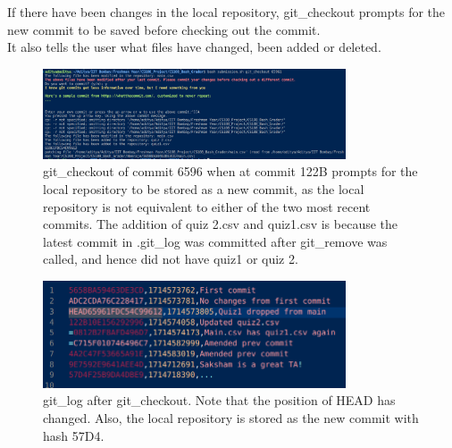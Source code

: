 \documentclass{article}
\begin{document}
    If there have been changes in the local repository, git\_checkout prompts for the new commit to be saved before checking out the commit.\\
    It also tells the user what files have changed, been added or deleted.\\
    \begin{figure}[htbp]
        \centering
        \includegraphics[width=0.8\textwidth]{git_checkout_65961_from_122B.png}
        \caption{git\_checkout of commit 6596 when at commit 122B prompts for the local repository to be stored as a new commit, as the local repository is not equivalent to either of the two most recent commits. The addition of quiz 2.csv and quiz1.csv is because the latest commit in .git\_log was committed after git\_remove was called, and hence did not have quiz1 or quiz 2.}
        \label{fig:git_checkout}
    \end{figure}
    \begin{figure}[htbp]
        \centering
        \includegraphics[width=0.8\textwidth]{git log file after checkout.png}
        \caption{git\_log after git\_checkout. Note that the position of HEAD has changed. Also, the local repository is stored as the new commit with hash 57D4.}
        \label{fig:git_checkout_same}
    \end{figure}
\end{document}
